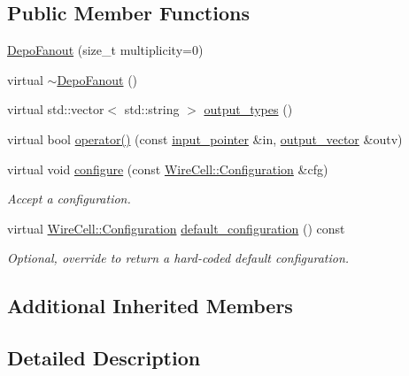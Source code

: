 \subsection*{Public Member Functions}
\begin{DoxyCompactItemize}
\item 
\hyperlink{class_wire_cell_1_1_gen_1_1_depo_fanout_a3274b5286089519f8313536608ce8bdb}{Depo\+Fanout} (size\+\_\+t multiplicity=0)
\item 
virtual \hyperlink{class_wire_cell_1_1_gen_1_1_depo_fanout_a4ea33d21379ce4b33eb70f8f72c7a426}{$\sim$\+Depo\+Fanout} ()
\item 
virtual std\+::vector$<$ std\+::string $>$ \hyperlink{class_wire_cell_1_1_gen_1_1_depo_fanout_acb986929b5cd38a5ea197985b103102f}{output\+\_\+types} ()
\item 
virtual bool \hyperlink{class_wire_cell_1_1_gen_1_1_depo_fanout_a962dbfcaef407243a4089e447b9e554b}{operator()} (const \hyperlink{class_wire_cell_1_1_i_fanout_node_aefd36d56a531edf1990fe6e263d9c266}{input\+\_\+pointer} \&in, \hyperlink{class_wire_cell_1_1_i_fanout_node_a650cda83709781daac2d67af7c3706df}{output\+\_\+vector} \&outv)
\item 
virtual void \hyperlink{class_wire_cell_1_1_gen_1_1_depo_fanout_ad12626c824e3e47f9390f6defb2bac78}{configure} (const \hyperlink{namespace_wire_cell_a9f705541fc1d46c608b3d32c182333ee}{Wire\+Cell\+::\+Configuration} \&cfg)
\begin{DoxyCompactList}\small\item\em Accept a configuration. \end{DoxyCompactList}\item 
virtual \hyperlink{namespace_wire_cell_a9f705541fc1d46c608b3d32c182333ee}{Wire\+Cell\+::\+Configuration} \hyperlink{class_wire_cell_1_1_gen_1_1_depo_fanout_a23fa2c3ca19bd83d37254fa0fd085f8c}{default\+\_\+configuration} () const
\begin{DoxyCompactList}\small\item\em Optional, override to return a hard-\/coded default configuration. \end{DoxyCompactList}\end{DoxyCompactItemize}
\subsection*{Additional Inherited Members}


\subsection{Detailed Description}


